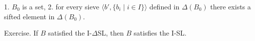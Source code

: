 1. $B_0$ is a set,
2. for every sieve $\langle b', \{b_i \mid i \in I\} \rangle$ defined in $\Delta(B_0)$ there exists a sifted element in $\Delta(B_0)$.

Exercise. If $B$ satisfied the I-$\Delta$SL, then $B$ satisfies the I-SL.
